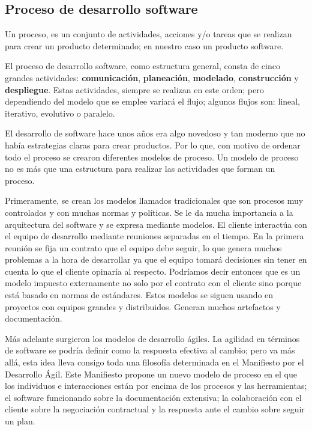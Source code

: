 \label{cap2:sec:scrum}

	\subsection{Proceso de desarrollo software}
	\label{cap2:subsec:proceso desarrollo software}
	Un proceso, es un conjunto de actividades, acciones y/o tareas que se realizan para crear un producto determinado; en nuestro caso un producto software.
	
	El proceso de desarrollo software, como estructura general, consta de cinco grandes actividades: \textbf{comunicación}, \textbf{planeación}, \textbf{modelado}, \textbf{construcción} y \textbf{despliegue}. Estas actividades, siempre se realizan en este orden; pero dependiendo del modelo que se emplee variará el flujo; algunos flujos son: lineal, iterativo, evolutivo o paralelo.
	
	El desarrollo de software hace unos años era algo novedoso y tan moderno que no había estrategias claras para crear productos. Por lo que, con motivo de ordenar todo el proceso se crearon diferentes modelos de proceso. Un modelo de proceso no es más que una estructura para realizar las actividades que forman un proceso.
	
	Primeramente, se crean los modelos llamados tradicionales que son procesos muy controlados y con muchas normas y políticas. Se le da mucha importancia a la arquitectura del software y se expresa mediante modelos. El cliente interactúa con el equipo de desarrollo mediante reuniones separadas en el tiempo. En la primera reunión se fija un contrato que el equipo debe seguir, lo que genera muchos problemas a la hora de desarrollar ya que el equipo tomará decisiones sin tener en cuenta lo que el cliente opinaría al respecto. Podríamos decir entonces que es un modelo impuesto externamente no solo por el contrato con el cliente sino porque está basado en normas de estándares. 
	Estos modelos se siguen usando en proyectos con equipos grandes y distribuidos. Generan muchos artefactos y documentación.
	
	Más adelante surgieron los modelos de desarrollo ágiles. 
	La agilidad en términos de software se podría definir como la respuesta efectiva al cambio; pero va más allá, esta idea lleva consigo toda una filosofía determinada en el Manifiesto por el Desarrollo Ágil. Este Manifiesto propone un nuevo modelo de proceso en el que los individuos e interacciones están por encima de los procesos y las herramientas; el software funcionando sobre la documentación extensiva; la colaboración con el cliente sobre la negociación contractual y la respuesta ante el cambio sobre seguir un plan. 

